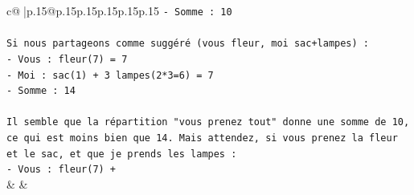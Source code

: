 \documentclass{article}
\begin{document}
{\begin{supertabular}{c@{$\;$}|p{.15\linewidth}@{}p{.15\linewidth}p{.15\linewidth}p{.15\linewidth}p{.15\linewidth}p{.15\linewidth}}
{{{\texttt{{-} Somme : 10} \\
\\ 
\texttt{Si nous partageons comme suggéré (vous fleur, moi sac+lampes) :} \\
\texttt{{-} Vous : fleur(7) = 7} \\
\texttt{{-} Moi : sac(1) + 3 lampes(2*3=6) = 7} \\
\texttt{{-} Somme : 14} \\
\\ 
\texttt{Il semble que la répartition "vous prenez tout" donne une somme de 10, ce qui est moins bien que 14. Mais attendez, si vous prenez la fleur et le sac, et que je prends les lampes :} \\
\texttt{{-} Vous : fleur(7) +} \\
            }
        }
    }
    & & \\ \\


\end{supertabular}}
\end{document}
